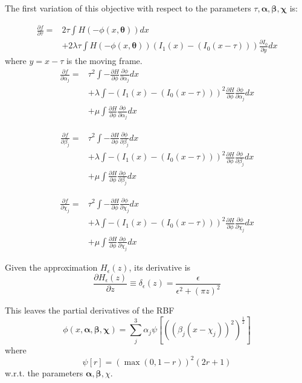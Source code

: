 \documentclass[]{article}
\newcommand{\vect}[1]{\boldsymbol{#1}}
\begin{document}
The first variation of this objective with respect to the parameters
\(\tau, \vect{\alpha}, \vect{\beta}, \vect{\chi}\) is:

\begin{eqnarray*}
\frac{\partial f}{\partial \tau} = & 2\tau\int H(-\phi(x,\vect{\theta})) dx \\
& + 2\lambda\tau \int H(-\phi(x,\vect{\theta}))\left (I_1(x) - (I_0(x-\tau))
\right )\frac{\partial I_0}{\partial y} dx
\end{eqnarray*}
where \(y = x - \tau\) is the moving frame.
\begin{eqnarray*}
\frac{\partial f}{\partial \alpha_j} = & \tau^2\int -\frac{\partial
  H}{\partial \phi}\frac{\partial \phi}{\partial \alpha_j} dx \\
& + \lambda \int -\left (I_1(x) - (I_0(x-\tau)) \right )^2 \frac{\partial
  H}{\partial \phi}\frac{\partial \phi}{\partial \alpha_j} dx \\
& + \mu \int \frac{\partial
  H}{\partial \phi}\frac{\partial \phi}{\partial \alpha_j} dx
\end{eqnarray*}

\begin{eqnarray*}
\frac{\partial f}{\partial \beta_j} = & \tau^2\int -\frac{\partial
  H}{\partial \phi}\frac{\partial \phi}{\partial \beta_j} dx \\
&+ \lambda \int -\left (I_1(x) - (I_0(x-\tau)) \right )^2 \frac{\partial 
  H}{\partial \phi}\frac{\partial \phi}{\partial \beta_j} dx \\
& + \mu \int \frac{\partial
  H}{\partial \phi}\frac{\partial \phi}{\partial \beta_j} dx
\end{eqnarray*}

\begin{eqnarray*}
\frac{\partial f}{\partial \chi_j} = & \tau^2\int -\frac{\partial
  H}{\partial \phi}\frac{\partial \phi}{\partial \chi_j} dx \\
& + \lambda \int -\left (I_1(x) - (I_0(x-\tau)) \right )^2 \frac{\partial
  H}{\partial \phi}\frac{\partial \phi}{\partial \chi_j} dx \\
& + \mu \int \frac{\partial
  H}{\partial \phi}\frac{\partial \phi}{\partial \chi_j} dx
\end{eqnarray*}

\par
Given the approximation \(H_\epsilon(z)\), its derivative is
\begin{equation}
\frac{\partial H_\epsilon(z)}{\partial z} \equiv \delta_\epsilon(z) = 
\frac{\epsilon}{\epsilon^2 + (\pi z)^2}
\end{equation}
\par
This leaves the partial derivatives of the RBF 
\begin{equation}
\phi(x,\vect{\alpha},\vect{\beta},\vect{\chi}) = \sum_{j}^{3}\alpha_j \psi \left [
  ((\beta_j(x-\chi_j))^2)^{\frac{1}{2}} \right ]
\end{equation}
where
\begin{equation}
\psi[r] = \left ( \max{(0,1-r)} \right )^2(2r+1)
\end{equation}
w.r.t. the parameters \(\vect{\alpha}, \vect{\beta}, \chi\).
\end{document}
